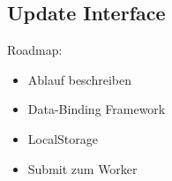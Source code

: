 \subsection{Update Interface}
Roadmap:
\begin{itemize}
\item Ablauf beschreiben
\item Data-Binding Framework
\item LocalStorage
\item Submit zum Worker
\end{itemize}